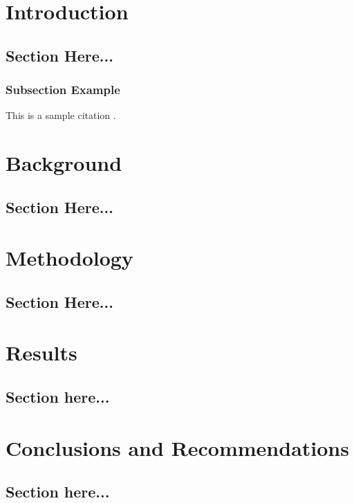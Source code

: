 \let\textcircled=\pgftextcircled
\chapter{Introduction}

\section{Section Here...}
\label{sec:intro}

\subsection{Subsection Example}
This is a sample citation \cite{harrison2014ranking}.


\let\textcircled=\pgftextcircled
\chapter{Background}

\section{Section Here...}
\label{sec:background}

\let\textcircled=\pgftextcircled
\chapter{Methodology}

\section{Section Here...}
\label{sec:method}


\let\textcircled=\pgftextcircled
\chapter{Results}

\section{Section here...}
\label{sec:results}


\let\textcircled=\pgftextcircled
\chapter{Conclusions and Recommendations}

\section{Section here...}
\label{sec:conclusion}

